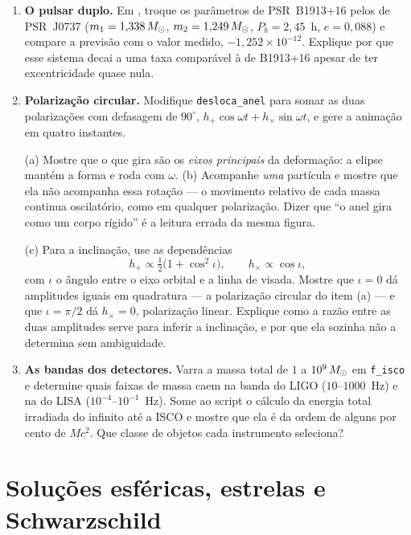 \documentclass[12pt,a4paper,oneside]{book}
\theoremstyle{rgplain}
\theoremstyle{rgremark}
\begin{document}
\begin{enumerate}
  \item \textbf{O pulsar duplo.} Em , troque os parâmetros
de PSR~B1913+16 pelos de PSR~J0737
($m_1=1{,}338\,M_\odot$, $m_2=1{,}249\,M_\odot$, $P_b=2{,}45$~h, $e=0{,}088$) e
compare a previsão com o valor medido, $-1{,}252\times10^{-12}$. Explique
por que esse sistema decai a uma taxa comparável à de B1913+16 apesar de ter
excentricidade quase nula.

  \item \textbf{Polarização circular.} Modifique \texttt{desloca\_anel} para somar
as duas polarizações com defasagem de $90^\circ$,
$h_+\cos\omega t + h_\times\sin\omega t$, e gere a animação em quatro
instantes.

(a) Mostre que o que gira são os \emph{eixos principais} da deformação: a
elipse mantém a forma e roda com $\omega$. (b) Acompanhe \emph{uma} partícula
e mostre que ela não acompanha essa rotação --- o movimento relativo de cada
massa continua oscilatório, como em qualquer polarização. Dizer que ``o anel
gira como um corpo rígido'' é a leitura errada da mesma figura.

(c) Para a inclinação, use as dependências
\[
  h_+\propto\tfrac12\bigl(1+\cos^2\iota\bigr) ,
  \qquad
  h_\times\propto\cos\iota ,
\]
com $\iota$ o ângulo entre o eixo orbital e a linha de visada. Mostre que
$\iota=0$ dá amplitudes iguais em quadratura --- a polarização circular do
item (a) --- e que $\iota=\pi/2$ dá $h_\times=0$, polarização linear. Explique
como a razão entre as duas amplitudes serve para inferir a inclinação, e por
que ela sozinha não a determina sem ambiguidade.

  \item \textbf{As bandas dos detectores.} Varra a massa total de $1$ a
$10^{9}\,M_\odot$ em \texttt{f\_isco} e determine quais faixas de massa caem
na banda do LIGO ($10$--$1000$~Hz) e na do LISA
($10^{-4}$--$10^{-1}$~Hz). Some ao script o cálculo da energia total
irradiada do infinito até a ISCO e mostre que ela é da ordem de alguns por
cento de $Mc^2$. Que classe de objetos cada instrumento seleciona?
\end{enumerate}


\chapter[Soluções esféricas e Schwarzschild]{Soluções esféricas, estrelas e
Schwarzschild}
\label{cap:schwarzschild}
\end{document}
